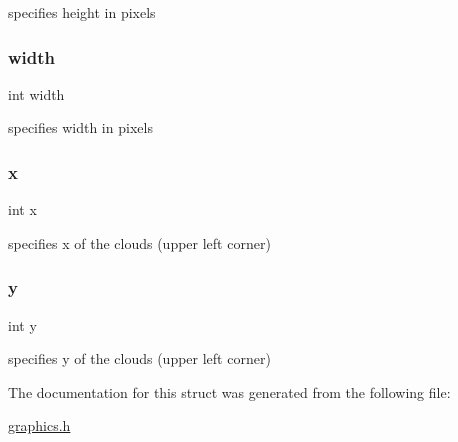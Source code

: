 specifies height in pixels 

\mbox{\label{struct_clouds_a2474a5474cbff19523a51eb1de01cda4}} 
\subsubsection{\texorpdfstring{width}{width}}
{\footnotesize\ttfamily int width}



specifies width in pixels 

\mbox{\label{struct_clouds_a6150e0515f7202e2fb518f7206ed97dc}} 
\subsubsection{\texorpdfstring{x}{x}}
{\footnotesize\ttfamily int x}



specifies x of the clouds (upper left corner) 

\mbox{\label{struct_clouds_a0a2f84ed7838f07779ae24c5a9086d33}} 
\subsubsection{\texorpdfstring{y}{y}}
{\footnotesize\ttfamily int y}



specifies y of the clouds (upper left corner) 



The documentation for this struct was generated from the following file\+:\begin{DoxyCompactItemize}
\item 
\hyperlink{graphics_8h}{graphics.\+h}\end{DoxyCompactItemize}
